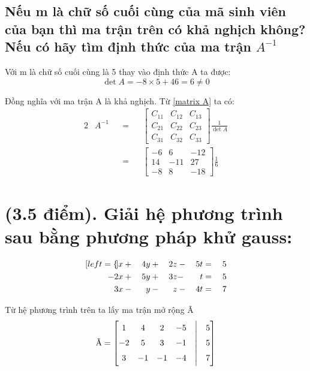 \documentclass{article}
\begin{document}
\subsection{Nếu m là chữ số cuối cùng của mã sinh viên của bạn thì ma trận trên có khả nghịch không? Nếu có hãy tìm định thức của ma trận $A^{-1}$}
\begin{flushleft}
	Với m là chữ số cuối cùng là 5 thay vào định thức A ta được:  \\
	\begin{equation}
		\det A = -8 \times 5 + 46 = 6 \neq 0
		\label{matrix A}
	\end{equation} 
	   
	Đồng nghĩa với ma trận A là khả nghịch. Từ \eqref{matrix A} ta có:
	\begin{alignat*}{2}
		  & A^{-1} &   & = &   & \begin{bmatrix} 
		C_{11} & C_{12} & C_{13} \\
		C_{21} & C_{22} & C_{23} \\
		C_{31} & C_{32} & C_{33}
		\end{bmatrix} \frac{1}{\det A} \\
		  &        &   & = &   & \begin{bmatrix} 
		-6 & 6 & -12 \\
		14 & -11 & 27 \\
		-8 & 8 & -18
		\end{bmatrix} \frac{1}{6}
	\end{alignat*}
\end{flushleft}
\pagebreak

\section[Câu 2]{{\large\normalfont(3.5 điểm). Giải hệ phương trình sau bằng phương pháp khử gauss:}}
\begin{alignat*}{4}[left = \empheqlbrace]
	x   & {}+{} & 4y & {}+{}  & 2z    & {}-{} & 5t  & {}={} & 5 \\
	-2x & {}+{} & 5y & {} +{} & 3z {} & -     & {}t & {}={} & 5 \\
	3x  & {}-{} & y  & {}-{}  & z     & {}-{} & 4t  & {}={} & 7 
\end{alignat*}

Từ hệ phương trình trên ta lấy ma trận mở rộng Ã \\
\begin{equation*}
	\text{Ã} =  \begin{bmatrix}
	1 & 4 & 2  & -5 & \Bigm| & 5 \\
	-2 & 5 & 3 & -1 & \Bigm| & 5 \\
	3 & -1 & -1 & -4 & \Bigm| & 7
	\end{bmatrix}
\end{equation*}
\end{document}
